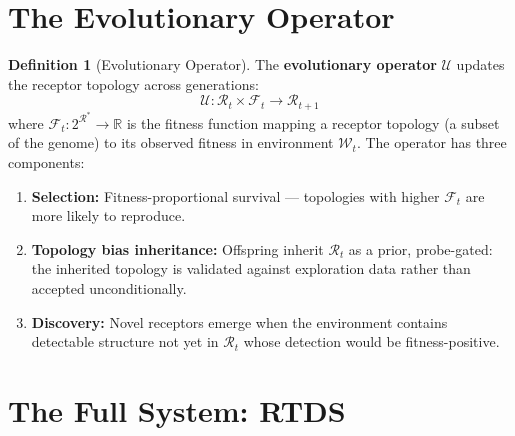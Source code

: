 \documentclass[12pt]{article}
\theoremstyle{definition}
\newtheorem{definition}{Definition}
\begin{document}
\section{The Evolutionary Operator}

\begin{definition}[Evolutionary Operator]
The \textbf{evolutionary operator} $\mathcal{U}$ updates the receptor topology across
generations:
\[
\mathcal{U} : \mathcal{R}_t \times \mathcal{F}_t \to \mathcal{R}_{t+1}
\]
where $\mathcal{F}_t : 2^{\mathcal{R}^*} \to \mathbb{R}$ is the fitness function mapping
a receptor topology (a subset of the genome) to its observed fitness in environment
$\mathcal{W}_t$. The operator has three components:
\begin{enumerate}
    \item \textbf{Selection:} Fitness-proportional survival --- topologies with higher
    $\mathcal{F}_t$ are more likely to reproduce.
    \item \textbf{Topology bias inheritance:} Offspring inherit $\mathcal{R}_t$ as a
    prior, probe-gated: the inherited topology is validated against exploration data
    rather than accepted unconditionally.
    \item \textbf{Discovery:} Novel receptors emerge when the environment contains
    detectable structure not yet in $\mathcal{R}_t$ whose detection would be
    fitness-positive.
\end{enumerate}
\end{definition}

\section{The Full System: RTDS}
\end{document}
